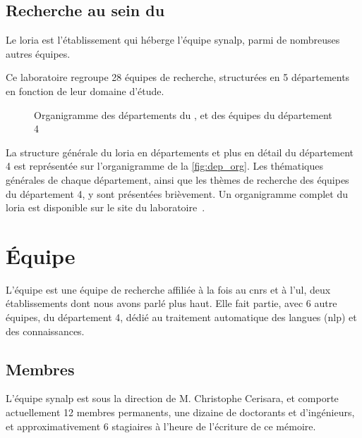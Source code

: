 \newpage
\subsection{Recherche au sein du }
Le \gls{loria} est l'établissement qui héberge l'équipe \gls{synalp}, parmi de nombreuses autres équipes.

Ce laboratoire regroupe 28 équipes de recherche, structurées en 5 départements en fonction de leur domaine d'étude.

\begin{figure}[h]
	\centering
	\scalebox{1}{}
	\caption{Organigramme des départements du , et des équipes du département 4}
	\label{fig:dep_org}
\end{figure}

La structure générale du \gls{loria} en départements et plus en détail du département 4 est représentée sur l'organigramme de la \autoref{fig:dep_org}. %
Les thématiques générales de chaque département, ainsi que les thèmes de recherche des équipes du département 4, y sont présentées brièvement.
Un organigramme complet du \gls{loria} est disponible sur {le site du laboratoire~\autocite{org_loria}}.

\newpage
\section{Équipe }
L'équipe  est une équipe de recherche affiliée à la fois au \gls{cnrs} et à l'\gls{ul}, deux établissements dont nous avons parlé plus haut.
Elle fait partie, avec 6 autre équipes, du département 4, dédié au traitement automatique des langues (\gls{nlp}) et des connaissances.

\subsection{Membres}
L'équipe \gls{synalp} est sous la direction de M. Christophe Cerisara, et comporte actuellement 12 membres permanents, une dizaine de doctorants et d'ingénieurs, et approximativement 6 stagiaires à l'heure de l'écriture de ce mémoire.

